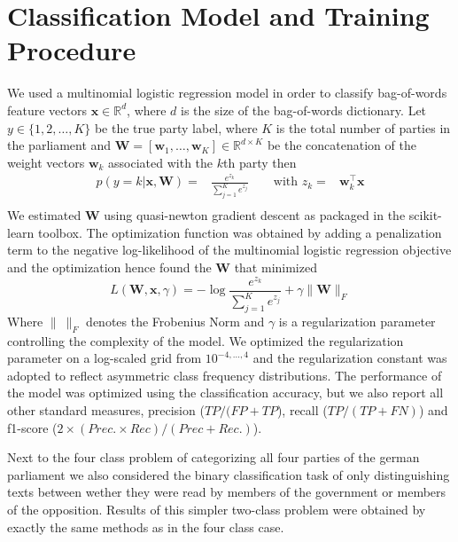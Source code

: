 \documentclass[runningheads,a4paper]{llncs}
\renewcommand{\vec}[1]{\mathbf{#1}}
\newcommand{\R}{\mathds{R}}
\begin{document}
\section{Classification Model and Training Procedure}

We used a multinomial logistic regression model in order to classify bag-of-words feature vectors $\vec{x}\in\R^d$, where $d$ is the size of the bag-of-words dictionary. Let $y\in\{1,2,\dots,K\}$ be the true party label, where $K$ is the total number of parties in the parliament and $\vec{W}=[\vec{w}_1,\dots,\vec{w}_K]\in\R^{d\times K}$ be the concatenation of the weight vectors $\vec{w}_k$ associated with the $k$th party then 
\begin{eqnarray}\label{eq:logreg_multiclass}
p(y=k|\vec{x},\vec{W}) = &\frac{e^{z_k}}{\sum_{j=1}^K e^{z_j}} \qquad \textrm{with }  z_k=&\vec{w}_k^{\top}\vec{x} \\\nonumber
\end{eqnarray}
%
We estimated $\vec{W}$ using quasi-newton gradient descent as packaged in the scikit-learn toolbox. The optimization function was obtained by adding a penalization term to the negative log-likelihood of the multinomial logistic regression objective and the optimization hence found the $\vec{W}$ that minimized
\begin{equation}\label{eq:objective}
L(\vec{W}, \vec{x}, \gamma) = - \log{\frac{e^{z_k}}{\sum_{j=1}^K e^{z_j}}}+ \gamma \| \vec{W} \|_{F}
\end{equation}
Where $\|~\|_F$ denotes the Frobenius Norm and $\gamma$ is a regularization parameter controlling the complexity of the model. 
 We optimized the regularization parameter on a log-scaled grid from $10^{-4,\dots,4}$ and the regularization constant was adopted to reflect asymmetric class frequency distributions. The performance of the model was optimized using the classification accuracy, but we also report all other standard measures, precision ($TP / (FP + TP$), recall ($TP / (TP + FN)$) and f1-score ($2\times (Prec. \times Rec) / (Prec + Rec.)$). 

Next to the four class problem of categorizing all four parties of the german parliament we also considered the binary classification task of only distinguishing texts between wether they were read by members of the government or members of the opposition. Results of this simpler two-class problem were obtained by exactly the same methods as in the four class case. 
\end{document}
